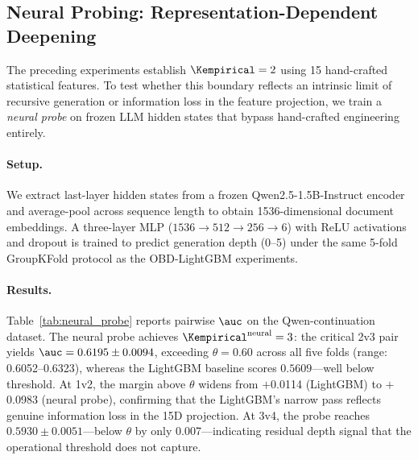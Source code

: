 
\subsection{Neural Probing: Representation-Dependent Deepening}
\label{sec:neural_probe}

The preceding experiments establish $\Kempirical = 2$ using 15 hand-crafted statistical features.
To test whether this boundary reflects an intrinsic limit of recursive generation or information loss in the feature projection, we train a \emph{neural probe} on frozen LLM hidden states that bypass hand-crafted engineering entirely.

\paragraph{Setup.}
We extract last-layer hidden states from a frozen Qwen2.5-1.5B-Instruct encoder and average-pool across sequence length to obtain 1536-dimensional document embeddings.
A three-layer MLP ($1536 \to 512 \to 256 \to 6$) with ReLU activations and dropout is trained to predict generation depth (0--5) under the same 5-fold GroupKFold protocol as the OBD-LightGBM experiments.

\paragraph{Results.}
Table~\ref{tab:neural_probe} reports pairwise $\auc$ on the Qwen-continuation dataset.%
The neural probe achieves $\Kempirical^{\text{neural}} = 3$: the critical 2v3 pair yields $\auc = 0.6195 \pm 0.0094$, exceeding $\theta = 0.60$ across all five folds (range: 0.6052--0.6323), whereas the LightGBM baseline scores $0.5609$---well below threshold.%
At 1v2, the margin above $\theta$ widens from $+$0.0114 (LightGBM) to $+$0.0983 (neural probe), confirming that the LightGBM's narrow pass reflects genuine information loss in the 15D projection.%
At 3v4, the probe reaches $0.5930 \pm 0.0051$---below $\theta$ by only 0.007---indicating residual depth signal that the operational threshold does not capture.%



